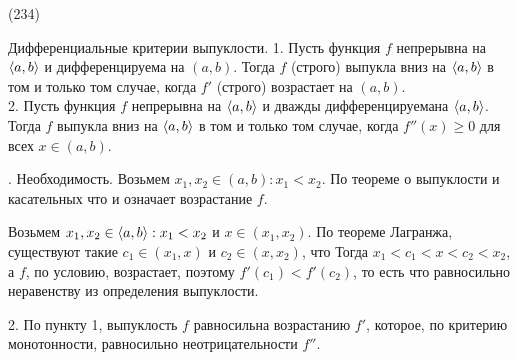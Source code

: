 (234)

\T \q Дифференциальные критерии выпуклости. 1. Пусть функция $f$ непрерывна на $\langle a, b \rangle$ и дифференцируема на $(a, b)$. Тогда $f$ (строго) выпукла вниз на $\langle a, b \rangle$ в том и только том случае, когда $f'$ (строго) возрастает на $(a, b)$.\\
2. Пусть функция $f$ непрерывна на $\langle a, b \rangle$ и дважды дифференцируемана $\langle a, b \rangle$. Тогда $f$ выпукла вниз на $\langle a, b \rangle$ в том и только том случае, когда $f''(x) \ge 0$ для всех $x \in (a, b)$.

. Необходимость. Возьмем $x_1, x_2 \in (a, b): x_1 < x_2$. По теореме о выпуклости и касательных  что и означает возрастание $f$.

Возьмем $x_1, x_2 \in \langle a, b \rangle: x_1 < x_2$ и $x \in (x_1, x_2)$. По теореме Лагранжа, существуют такие $c_1 \in (x_1, x)$ и $c_2 \in (x, x_2)$, что  Тогда $x_1 < c_1 < x < c_2 < x_2$, а $f$, по условию, возрастает, поэтому $f'(c_1) < f'(c_2)$, то есть  что равносильно неравенству из определения выпуклости.

2. По пункту 1, выпуклость $f$ равносильна возрастанию $f'$, которое, по критерию монотонности, равносильно неотрицательности $f''$.